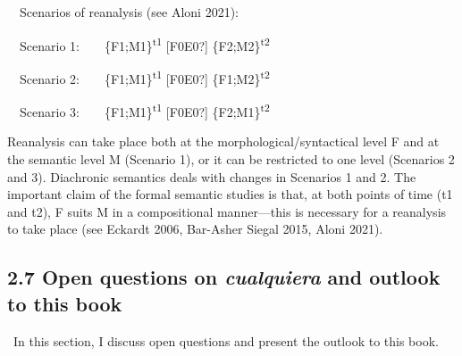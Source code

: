 \begin{styleStandard}
\label{bkm:Ref65487536}\ \ Scenarios of reanalysis (see Aloni 2021):
\end{styleStandard}

\begin{styleStandard}
\ \ Scenario 1:\ \ \ \ \{F1;M1\}\textsuperscript{t1} [F0E0?] \{F2;M2\}\textsuperscript{t2}
\end{styleStandard}

\begin{styleStandard}
\ \ Scenario 2:\ \ \ \ \{F1;M1\}\textsuperscript{t1} [F0E0?] \{F1;M2\}\textsuperscript{t2}
\end{styleStandard}

\begin{styleStandard}
\ \ Scenario 3:\ \ \ \ \{F1;M1\}\textsuperscript{t1} [F0E0?] \{F2;M1\}\textsuperscript{t2}
\end{styleStandard}

\begin{styleStandard}
Reanalysis can take place both at the morphological/syntactical level F and at the semantic level M (Scenario 1), or it can be restricted to one level (Scenarios 2 and 3). Diachronic semantics deals with changes in Scenarios 1 and 2. The important claim of the formal semantic studies is that, at both points of time (t1 and t2), F suits M in a compositional manner—this is necessary for a reanalysis to take place (see Eckardt 2006, Bar-Asher Siegal 2015, Aloni 2021).
\end{styleStandard}

\subsection[2.7 Open questions on cualquiera and outlook to this book]{\textbf{2.7 Open questions on }\textbf{\textit{cualquiera}}\textbf{\textit{ }}\textbf{and outlook to this book}}
\begin{styleStandard}
\ In this section, I discuss open questions and present the outlook to this book.
\end{styleStandard}

